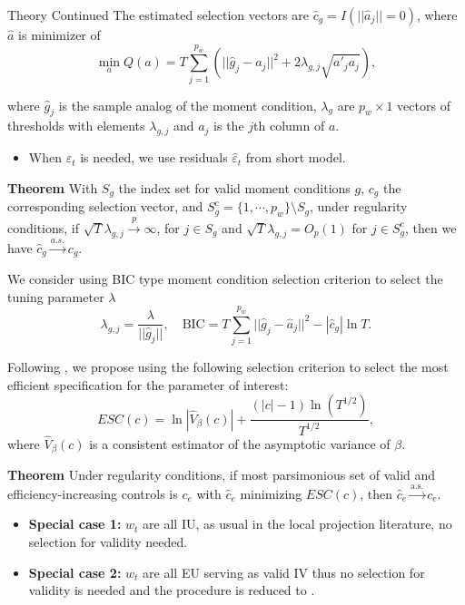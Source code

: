 \documentclass[final]{beamer}
\newlength{\colwidth}
\begin{document}
\begin{frame}[t]
\begin{columns}[t]
\begin{column}{\colwidth}
    \begin{block}{Theory Continued}
         The estimated selection vectors are  $\hat{c}_g=I(||\hat{a}_{j}||=0)$, where $\hat{a}$ is minimizer of
    $$
    \min_{a}Q(a)=T\sum_{j=1}^{p_{w}}\left(||\hat g_j-a_{j}||^{2}+2\lambda_{g,j}\sqrt{a'_{j}a_{j}}\right),
    $$

    where $\hat g_j$ is the sample analog of the moment condition, $\lambda_g$ are $p_{w}\times 1$ vectors of thresholds with elements $\lambda_{g,j}$ and $a_j$ is the $j$th column of $a$.
    \begin{itemize}[label = \triangle]
        \item When $\varepsilon_t$ is needed, we use residuals $\hat \varepsilon_t$ from short model.
    \end{itemize}
    \textbf{Theorem} With $S_{g}$ the index set for valid moment conditions $g$, $c_g$ the corresponding selection vector, and $S_{g}^{c}=\{1,\cdots,p_{w}\} \setminus S_{g}$, under regularity conditions, if $\sqrt{T}\lambda_{g,j}\xrightarrow{p}\infty$, for $j\in S_{g}$ and $\sqrt{T}\lambda_{g,j}=O_{p}(1)$ for $j\in S_{g}^{c}$, then we have $\hat{c}_g\xrightarrow{a.s.}c_g$.

    We consider using BIC type moment condition selection criterion to select the tuning parameter $\lambda$
    $$
    \lambda_{g,j} = \frac{\lambda}{||\hat{g}_j||},\quad \text{BIC} = T\sum_{j=1}^{p_{w}}||\hat g_j-\hat a_{j}||^{2} - |\hat c_g|\ln T.
    $$
\vspace{-10mm}
    
    Following \cite{hall2007information}, we propose using the following selection criterion to select the most efficient specification for the parameter of interest:
    $$ 
    ESC(c)=\ln \left|\hat{V}_{\beta}(c)\right|+\frac{(|c|-1)\ln(T^{1/2})}{T^{1/2}},
    $$
    where $\hat{V}_{\beta}(c)$ is a consistent estimator of the asymptotic variance of $\beta$.
    
    \textbf{Theorem} Under regularity conditions, if most parsimonious set of valid and efficiency-increasing controls is $ c_e$ with $\hat c_e$ minimizing $ESC(c)$, then $\hat c_e \xrightarrow{\mathrm{a.s.}} c_e$. 
    \begin{itemize}[label = \bullet]
        \item \textbf{Special case 1:} $w_t$ are all IU, as usual in the local projection literature, no selection for validity needed.
         \item \textbf{Special case 2:} $w_t$ are all EU serving as valid IV thus no selection for validity is needed and the procedure is reduced to \cite{hall2007information}.
    \end{itemize}
  \end{block}
  

\end{column}
\end{columns}
\end{frame}
\end{document}
